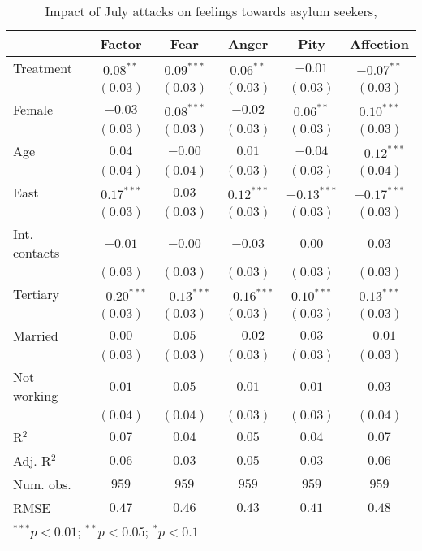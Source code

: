 
\begin{table}
\caption{Impact of July attacks on feelings towards asylum seekers, }
\begin{center}
\begin{tabular}{l c c c c c}
\toprule
 & Factor & Fear & Anger & Pity & Affection \\
\midrule
Treatment     & $0.08^{**}$   & $0.09^{***}$  & $0.06^{**}$   & $-0.01$       & $-0.07^{**}$  \\
              & $(0.03)$      & $(0.03)$      & $(0.03)$      & $(0.03)$      & $(0.03)$      \\
Female        & $-0.03$       & $0.08^{***}$  & $-0.02$       & $0.06^{**}$   & $0.10^{***}$  \\
              & $(0.03)$      & $(0.03)$      & $(0.03)$      & $(0.03)$      & $(0.03)$      \\
Age           & $0.04$        & $-0.00$       & $0.01$        & $-0.04$       & $-0.12^{***}$ \\
              & $(0.04)$      & $(0.04)$      & $(0.03)$      & $(0.03)$      & $(0.04)$      \\
East          & $0.17^{***}$  & $0.03$        & $0.12^{***}$  & $-0.13^{***}$ & $-0.17^{***}$ \\
              & $(0.03)$      & $(0.03)$      & $(0.03)$      & $(0.03)$      & $(0.03)$      \\
Int. contacts & $-0.01$       & $-0.00$       & $-0.03$       & $0.00$        & $0.03$        \\
              & $(0.03)$      & $(0.03)$      & $(0.03)$      & $(0.03)$      & $(0.03)$      \\
Tertiary      & $-0.20^{***}$ & $-0.13^{***}$ & $-0.16^{***}$ & $0.10^{***}$  & $0.13^{***}$  \\
              & $(0.03)$      & $(0.03)$      & $(0.03)$      & $(0.03)$      & $(0.03)$      \\
Married       & $0.00$        & $0.05$        & $-0.02$       & $0.03$        & $-0.01$       \\
              & $(0.03)$      & $(0.03)$      & $(0.03)$      & $(0.03)$      & $(0.03)$      \\
Not working   & $0.01$        & $0.05$        & $0.01$        & $0.01$        & $0.03$        \\
              & $(0.04)$      & $(0.04)$      & $(0.03)$      & $(0.03)$      & $(0.04)$      \\
\midrule
R$^2$         & $0.07$        & $0.04$        & $0.05$        & $0.04$        & $0.07$        \\
Adj. R$^2$    & $0.06$        & $0.03$        & $0.05$        & $0.03$        & $0.06$        \\
Num. obs.     & $959$         & $959$         & $959$         & $959$         & $959$         \\
RMSE          & $0.47$        & $0.46$        & $0.43$        & $0.41$        & $0.48$        \\
\bottomrule
\multicolumn{6}{l}{\scriptsize{$^{***}p<0.01$; $^{**}p<0.05$; $^{*}p<0.1$}}
\end{tabular}
\label{tab_emo}
\end{center}
\end{table}
